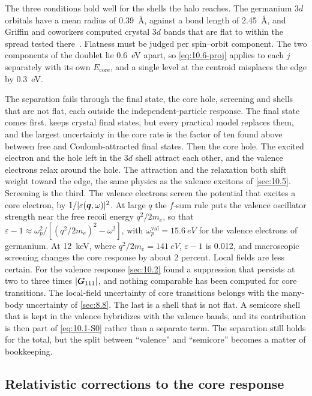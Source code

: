 The three conditions hold well for the shells the halo reaches. The germanium $3d$ orbitals have a mean radius of \SI{0.39}{\angstrom}, against a bond length of \SI{2.45}{\angstrom}, and Griffin and coworkers computed crystal $3d$ bands that are flat to within the spread tested there~\cite[Sect.~2.2]{griffin2021extended}. Flatness must be judged per spin--orbit component. The two components of the doublet lie \SI{0.6}{eV} apart, so \cref{eq:10.6-proj} applies to each $j$ separately with its own $E_{\mathrm{core}}$, and a single level at the centroid misplaces the edge by \SI{0.3}{eV}.

The separation fails through the final state, the core hole, screening and shells that are not flat, each outside the independent-particle response. The final state comes first.  keeps crystal final states, but every practical model replaces them, and the largest uncertainty in the core rate is the factor of ten found above between free and Coulomb-attracted final states. Then the core hole. The excited electron and the hole left in the $3d$ shell attract each other, and the valence electrons relax around the hole. The attraction and the relaxation both shift weight toward the edge, the same physics as the valence excitons of \cref{sec:10.5}. Screening is the third. The valence electrons screen the potential that excites a core electron, by $1/|\varepsilon(\bm{q},\omega)|^2$. At large $q$ the $f$-sum rule puts the valence oscillator strength near the free recoil energy $q^2/2m_e$, so that $\varepsilon - 1 \approx \omega_p^2/[(q^2/2m_e)^2 - \omega^2]$, with $\omega_p^{\mathrm{val}} = \SI{15.6}{eV}$ for the valence electrons of germanium. At \SI{12}{keV}, where $q^2/2m_e = \SI{141}{eV}$, $\varepsilon - 1$ is 0.012, and macroscopic screening changes the core response by about 2 percent. Local fields are less certain. For the valence response \cref{sec:10.2} found a suppression that persists at two to three times $|\bm{G}_{111}|$, and nothing comparable has been computed for core transitions. The local-field uncertainty of core transitions belongs with the many-body uncertainty of \cref{sec:8.8}. The last is a shell that is not flat. A semicore shell that is kept in the valence hybridizes with the valence bands, and its contribution is then part of \cref{eq:10.1-S0} rather than a separate term. The separation still holds for the total, but the split between ``valence'' and ``semicore'' becomes a matter of bookkeeping.

\subsection{Relativistic corrections to the core response}\label{sec:10.6-rel}

